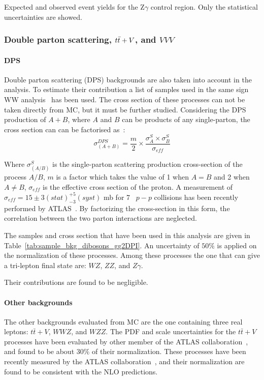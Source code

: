 \begin{table}[ht!]
\centering

\caption{Expected and observed event yields for the Z$\gamma$ control region. Only the statistical uncertainties are showed.}
\label{tab:Zgamma_CR}
\end{table}



\subsubsection{Double parton scattering, $t\bar{t} + V$, and $VVV$}

\paragraph{DPS}
\label{sec:bkg_DPS}
Double parton scattering (DPS) backgrounds are also taken into account in the analysis. To estimate their contribution a list of samples used in the same sign WW analysis~\cite{Aad:2014zda,DPS:Twiki} has been used. The cross section of these processes can not be taken directly from MC, but it must be further studied. Considering the DPS production of $A+B$, where $A$ and $B$ can be products of any single-parton, the cross section can can be factorised as~\cite{Gaunt:2010pi}:
\begin{equation}
	\sigma^{DPS}_{(A+B)}=\frac{m}{2}\times{}\frac{\sigma^{S}_{A}\times{}\sigma^{S}_{B}}{\sigma_{eff}}
\end{equation}	

Where $\sigma^{S}_{(A/B)}$ is the single-parton scattering production cross-section of the process $A/B$, $m$ is a factor which takes the value of 1 when $A=B$ and 2 when $A\ne B$, $\sigma_{eff}$ is the effective cross section of the proton. A measurement of $\sigma_{eff} =15\pm3(stat)^{+5}_{-3}(syst)$ mb for 7~\TeV{} $p-p$ collisions has been recently performed by ATLAS~\cite{Aad:2013bjm}. By factorizing the cross-section in this form, the correlation between the two parton interactions are neglected.

The samples and cross section that have been used in this analysis are given in Table~\ref{tab:sample_bkg_dibosons_gg2DPI}. An uncertainty of $50\%$ is applied on the normalization of these processes. Among these processes the one that can give a tri-lepton final state are: $WZ$, $ZZ$, and $Z\gamma$.
	
Their contributions are found to be negligible.


\paragraph{Other backgrounds}
The other backgrounds evaluated from MC are the one containing three real leptons: $t\bar{t}+V$, $WWZ$, and $WZZ$.
The PDF and scale uncertainties for the $t\bar{t}+V$ processes have been evaluated by other member of the ATLAS collaboration~\cite{ttV:Twiki}, and found
to be about $30\%$ of their normalization. These processes have been recently measured by the ATLAS collaboration~\cite{ATLAS-CONF-2015-032}, and their normalization are found to be consistent with the NLO predictions.

